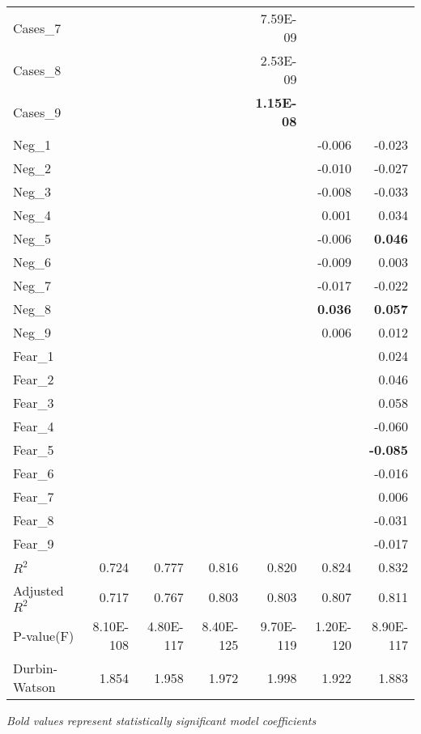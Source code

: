 \begin{longtable}[c]{@{}lrrrrrr@{}}
Cases\_7 &  &  &  & 7.59E-09 &  &  \\
Cases\_8 &  &  &  & 2.53E-09 &  &  \\
Cases\_9 &  &  &  & \textbf{1.15E-08} &  &  \\
Neg\_1 &  &  &  &  & -0.006 & -0.023 \\
Neg\_2 &  &  &  &  & -0.010 & -0.027 \\
Neg\_3 &  &  &  &  & -0.008 & -0.033 \\
Neg\_4 &  &  &  &  & 0.001 & 0.034 \\
Neg\_5 &  &  &  &  & -0.006 & \textbf{0.046} \\
Neg\_6 &  &  &  &  & -0.009 & 0.003 \\
Neg\_7 &  &  &  &  & -0.017 & -0.022 \\
Neg\_8 &  &  &  &  & \textbf{0.036} & \textbf{0.057} \\
Neg\_9 &  &  &  &  & 0.006 & 0.012 \\
Fear\_1 &  &  &  &  &  & 0.024 \\
Fear\_2 &  &  &  &  &  & 0.046 \\
Fear\_3 &  &  &  &  &  & 0.058 \\
Fear\_4 &  &  &  &  &  & -0.060 \\
Fear\_5 &  &  &  &  &  & \textbf{-0.085} \\
Fear\_6 &  &  &  &  &  & -0.016 \\
Fear\_7 &  &  &  &  &  & 0.006 \\
Fear\_8 &  &  &  &  &  & -0.031 \\
Fear\_9 &  &  &  &  &  & -0.017 \\
$R^2$ & 0.724 & 0.777 & 0.816 & 0.820 & 0.824 & 0.832 \\
Adjusted $R^2$ & 0.717 & 0.767 & 0.803 & 0.803 & 0.807 & 0.811 \\
P-value(F) & 8.10E-108 & 4.80E-117 & 8.40E-125 & 9.70E-119 & 1.20E-120 & 8.90E-117 \\
Durbin-Watson & 1.854 & 1.958 & 1.972 & 1.998 & 1.922 & 1.883 \\* \bottomrule
\end{longtable}
\emph{Bold values represent statistically significant model coefficients}\\

